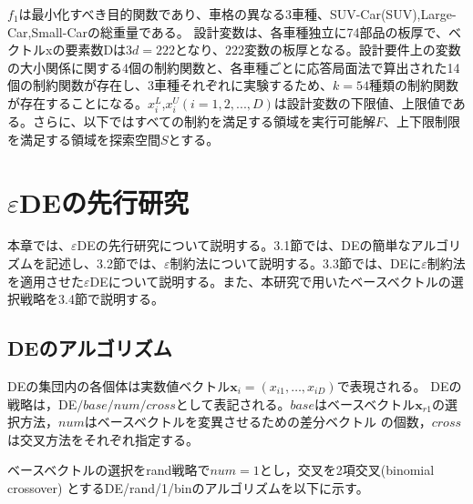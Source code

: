 \documentclass[a4paper,12pt]{jsreport}
\begin{document}
${f}_1$は最小化すべき目的関数であり、車格の異なる3車種、SUV-Car(SUV),Large-Car,Small-Carの総重量である。
設計変数は、各車種独立に74部品の板厚で、ベクトルxの要素数Dは$3d=222$となり、$222$変数の板厚となる。設計要件上の変数の大小関係に関する4個の制約関数と、各車種ごとに応答局面法で算出された14個の制約関数が存在し、3車種それぞれに実験するため、$k=54$種類の制約関数が存在することになる。${x}^L_i$,${x}^U_i(i=1,2,...,D)$は設計変数の下限値、上限値である。さらに、以下ではすべての制約を満足する領域を実行可能解$F$、上下限制限を満足する領域を探索空間$S$とする。



\chapter{$\varepsilon$DEの先行研究}
本章では、$\varepsilon$DEの先行研究\cite{先行研究}について説明する。3.1節では、DEの簡単なアルゴリズムを記述し、3.2節では、$\varepsilon$制約法について説明する。3.3節では、DEに$\varepsilon$制約法を適用させた$\varepsilon$DEについて説明する。また、本研究で用いたベースベクトルの選択戦略を3.4節で説明する。

\section{DEのアルゴリズム}
DEの集団内の各個体は実数値ベクトル$\bm{x}_i=(x_{i1}, \dots, x_{iD})$で表現される。
DEの戦略は，DE$/base/num/cross$として表記される。$base$はベースベクトル$\bm{x}_{r1}$の選択方法，$num$はベースベクトルを変異させるための差分ベクトル
の個数，$cross$ は交叉方法をそれぞれ指定する。

ベースベクトルの選択をrand戦略で$num=1$とし，交叉を2項交叉(binomial crossover) とするDE/rand/1/binのアルゴリズムを以下に示す。
\end{document}
